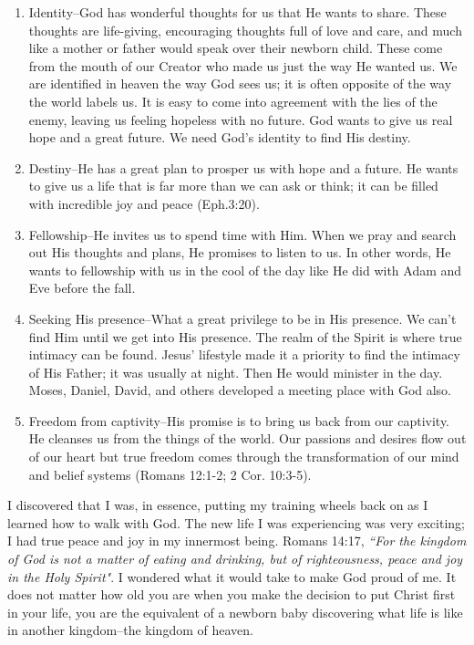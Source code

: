 \documentclass[oneside]{book}
\begin{document}
\begin{enumerate}
	\item Identity--God has wonderful thoughts for us that He wants to share. These thoughts are life-giving, encouraging thoughts full of love and care, and much like a mother or father would speak over their newborn child. These come from the mouth of our Creator who made us just the way He wanted us. We are identified in heaven the way God sees us; it is often opposite of the way the world labels us. It is easy to come into agreement with the lies of the enemy, leaving us feeling hopeless with no future. God wants to give us real hope and a great future. We need God's identity to find His destiny.
	\item Destiny--He has a great plan to prosper us with hope and a future. He wants to give us     a life that is far more than we can ask or think; it can be filled with incredible joy and peace (Eph.3:20).	
	\item Fellowship--He invites us to spend time with Him. When we pray and search out His thoughts and plans, He promises to listen to us. In other words, He wants to fellowship with us in the cool of the day like He did with Adam and Eve before the fall.	
	\item Seeking His presence--What a great privilege to be in His presence. We can't find Him until we get into His presence. The realm of the Spirit is where true intimacy can be found. Jesus' lifestyle made it a priority to find the intimacy of His Father; it was usually at night. Then He would minister in the day. Moses, Daniel, David, and others developed a meeting place with God also.	
	\item Freedom from captivity--His promise is to bring us back from our captivity. He cleanses us from the things of the world. Our passions and desires flow out of our heart but true freedom comes through the transformation of our mind and belief systems (Romans 12:1-2; 2 Cor. 10:3-5).
\end{enumerate}

I discovered that I was, in essence, putting my training wheels back on as I learned how to walk with God. The new life I was experiencing was very exciting; I had true peace and joy in my innermost being. Romans 14:17, \textit{``For the kingdom of God is not a matter of eating and drinking, but of righteousness, peace and joy in the Holy Spirit"}. I wondered what it would take to make God proud of me. It does not matter how old you are when you make the decision to put Christ first in your life, you are the equivalent of a newborn baby discovering what life is like in another kingdom--the kingdom of heaven.
\end{document}
